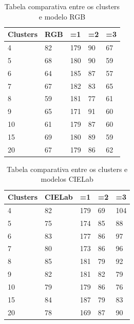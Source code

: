 \begin{table}[h!]
\centering
\caption{Tabela comparativa entre os clusters e modelo RGB}
\label{table:Tabela_comparativa_entre_os_clusters_e_modelo_rgb}\textbf{}
\begin{tabular}{lllll}
\hline
Clusters & RGB & =1 &             =2 &             =3                \\ \hline
4        & 82  & 179              & 90               & 67            \\ 
5        & 68  & 180              & 90               & 59            \\ 
6        & 64  & 185              & 87               & 57            \\ 
7        & 67  & 182              & 83               & 65            \\ 
8        & 59  & 181              & 77               & 61            \\ 
9        & 65  & 171              & 91               & 60            \\ 
10       & 61  & 179              & 87               & 60            \\ 
15       & 69  & 180              & 89               & 59            \\ 
20       & 67  & 179              & 86               & 62            \\ \hline
\end{tabular}%
\end{table}%

\begin{table}[h!]
\centering
\caption{Tabela comparativa entre os clusters e modelos CIELab}
\label{table:Tabela_comparativa_entre_os_clusters_e_modelo_cielab}\textbf{}
\begin{tabular}{lllll}
\hline
Clusters & CIELab & =1 &            =2 &                =3              \\ \hline
4        & 82     & 179              & 69               & 104           \\
5        & 75     & 174              & 85               & 88             \\ 
6        & 83     & 177              & 86               & 97             \\ 
7        & 80     & 173              & 86               & 96             \\ 
8        & 85     & 181              & 79               & 92             \\ 
9        & 82     & 181              & 82               & 79             \\ 
10       & 79     & 179              & 86               & 76             \\ 
15       & 84     & 187              & 79               & 83             \\ 
20       & 78     & 169              & 87               & 90             \\\hline
\end{tabular}%
\end{table} %

